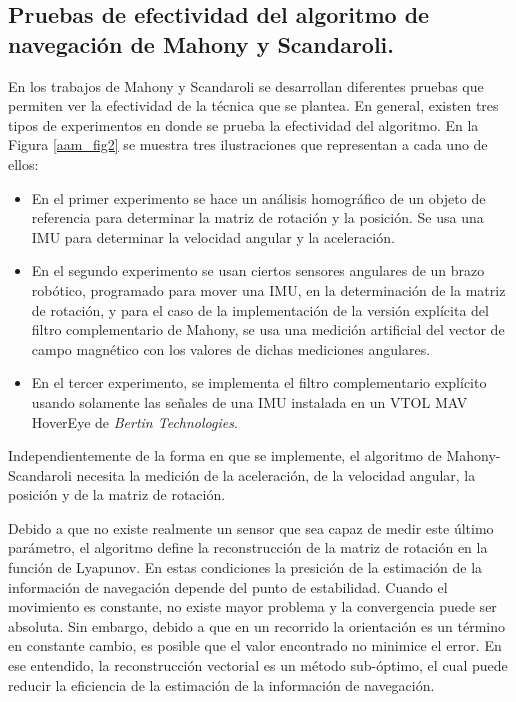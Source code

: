 \documentclass[10pt]{report}
\numberwithin{equation}{chapter}
\numberwithin{algorithm}{chapter}
\begin{document}
\subsection{Pruebas de efectividad del algoritmo de navegación de Mahony y Scandaroli.}
En los trabajos de Mahony y Scandaroli se desarrollan diferentes pruebas que permiten ver la efectividad de la técnica que se plantea. En general, existen tres tipos de experimentos en donde se prueba la efectividad del algoritmo. En la Figura \ref{aam_fig2} se muestra tres ilustraciones que representan a cada uno de ellos:
\begin{itemize}
\item En el primer experimento se hace un análisis homográfico de un objeto de referencia para determinar la matriz de rotación y la posición. Se usa una IMU para determinar la velocidad angular y la aceleración. 
\item En el segundo experimento se usan ciertos sensores angulares de un brazo robótico, programado para mover una IMU, en la determinación de la matriz de rotación, y para el caso de la implementación de la versión explícita del filtro complementario de Mahony, se usa una medición artificial del vector de campo magnético con los valores de dichas mediciones angulares.
\item En el tercer experimento, se implementa el filtro complementario explícito usando solamente las señales de una IMU instalada en un VTOL MAV HoverEye de \emph{Bertin Technologies}.
\end{itemize} 
Independientemente de la forma en que se implemente, el algoritmo de Mahony-Scandaroli necesita la medición de la aceleración, de la velocidad angular, la posición y de la matriz de rotación.\par
Debido a que no existe realmente un sensor que sea capaz de medir este último parámetro, el algoritmo define la reconstrucción de la matriz de rotación en la función de Lyapunov. En estas condiciones la presición de la estimación de la información de navegación depende del punto de estabilidad. Cuando el movimiento es constante, no existe mayor problema y la convergencia puede ser absoluta. Sin embargo, debido a que en un recorrido la orientación es un término en constante cambio, es posible que el valor encontrado no minimice el error. En ese entendido, la reconstrucción vectorial es un método sub-óptimo, el cual puede reducir la eficiencia de la estimación de la información de navegación.\par 
\end{document}
